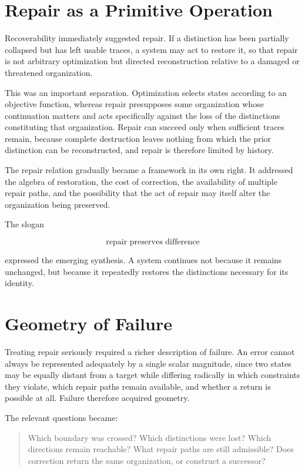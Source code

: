 \documentclass[11pt,oneside]{book}
\numberwithin{equation}{chapter}
\theoremstyle{definition}
\theoremstyle{plain}
\begin{document}
\section{Repair as a Primitive Operation}

Recoverability immediately suggested repair. If a distinction has been partially collapsed but has left usable traces, a system may act to restore it, so that repair is not arbitrary optimization but directed reconstruction relative to a damaged or threatened organization.

This was an important separation. Optimization selects states according to an objective function, whereas repair presupposes some organization whose continuation matters and acts specifically against the loss of the distinctions constituting that organization. Repair can succeed only when sufficient traces remain, because complete destruction leaves nothing from which the prior distinction can be reconstructed, and repair is therefore limited by history.

The repair relation gradually became a framework in its own right. It addressed the algebra of restoration, the cost of correction, the availability of multiple repair paths, and the possibility that the act of repair may itself alter the organization being preserved.

The slogan

\[
\text{repair preserves difference}
\]

expressed the emerging synthesis. A system continues not because it remains
unchanged, but because it repeatedly restores the distinctions necessary
for its identity.

\section{Geometry of Failure}

Treating repair seriously required a richer description of failure. An error cannot always be represented adequately by a single scalar magnitude, since two states may be equally distant from a target while differing radically in which constraints they violate, which repair paths remain available, and whether a return is possible at all. Failure therefore acquired geometry.

The relevant questions became:

\begin{quote}
Which boundary was crossed? Which distinctions were lost? Which directions
remain reachable? What repair paths are still admissible? Does correction
return the same organization, or construct a successor?
\end{quote}
\end{document}
